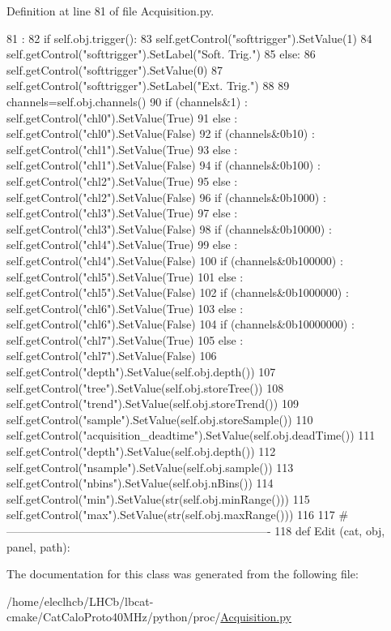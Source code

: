 Definition at line 81 of file Acquisition.py.


\begin{DoxyCode}
81                     :
82         if self.obj.trigger():
83             self.getControl("softtrigger").SetValue(1)
84             self.getControl("softtrigger").SetLabel("Soft. Trig.")
85         else:
86             self.getControl("softtrigger").SetValue(0)
87             self.getControl("softtrigger").SetLabel("Ext. Trig.")
88 
89         channels=self.obj.channels()
90         if (channels&1) : self.getControl("chl0").SetValue(True)
91         else : self.getControl("chl0").SetValue(False)
92         if (channels&0b10) : self.getControl("chl1").SetValue(True)
93         else : self.getControl("chl1").SetValue(False)
94         if (channels&0b100) : self.getControl("chl2").SetValue(True)
95         else : self.getControl("chl2").SetValue(False)
96         if (channels&0b1000) : self.getControl("chl3").SetValue(True)
97         else : self.getControl("chl3").SetValue(False)
98         if (channels&0b10000) : self.getControl("chl4").SetValue(True)
99         else : self.getControl("chl4").SetValue(False)
100         if (channels&0b100000) : self.getControl("chl5").SetValue(True)
101         else : self.getControl("chl5").SetValue(False)
102         if (channels&0b1000000) : self.getControl("chl6").SetValue(True)
103         else : self.getControl("chl6").SetValue(False)
104         if (channels&0b10000000) : self.getControl("chl7").SetValue(True)
105         else : self.getControl("chl7").SetValue(False)
106         self.getControl("depth").SetValue(self.obj.depth())
107         self.getControl("tree").SetValue(self.obj.storeTree())
108         self.getControl("trend").SetValue(self.obj.storeTrend())
109         self.getControl("sample").SetValue(self.obj.storeSample())
110         self.getControl("acquisition_deadtime").SetValue(self.obj.deadTime())
111         self.getControl("depth").SetValue(self.obj.depth())
112         self.getControl("nsample").SetValue(self.obj.sample())
113         self.getControl("nbins").SetValue(self.obj.nBins())
114         self.getControl("min").SetValue(str(self.obj.minRange()))
115         self.getControl("max").SetValue(str(self.obj.maxRange()))
116          
117 #----------------------------------------------------------------------
118 
def Edit (cat, obj, panel, path):
\end{DoxyCode}


The documentation for this class was generated from the following file:\begin{DoxyCompactItemize}
\item 
/home/eleclhcb/LHCb/lbcat-\/cmake/CatCaloProto40MHz/python/proc/\hyperlink{Acquisition_8py}{Acquisition.py}\end{DoxyCompactItemize}
